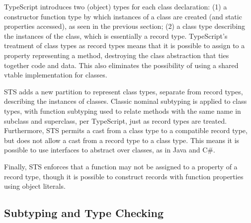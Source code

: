 TypeScript introduces two (object) types for each class declaration: 
(1) a constructor function type by which instances of a class
are created (and static properties accessed), as seen in the previous section; 
(2) a class type describing the instances of the class, which is essentially a record type. 
TypeScript's treatment of class types as record types
means that it is possible to assign to a property representing a method, 
destroying the class abstraction that ties together code and data. This also 
eliminates the possibility of using a shared vtable implementation for classes.

STS adds a new partition to represent class types, separate from record types, describing the instances of classes.
Classic nominal subtyping is applied to class types, with function subtyping used to relate methods with 
the same name in subclass and superclass, per TypeScript, just as record types are treated.
Furthermore, STS permits a cast from a class type
to a compatible record type, but does not allow a cast from a record type to a class type. This means
it is possible to use interfaces to abstract over classes, as in Java and C\#. 

Finally, STS enforces that a function may not
be assigned to a property of a record type, 
though it is possible to construct records with function properties using object literals. 

\subsection{Subtyping and Type Checking}

